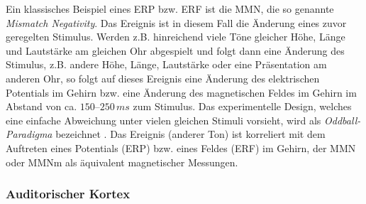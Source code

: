 \documentclass[doc,a4paper,12pt]{apa6}
\begin{document}
Ein klassisches Beispiel eines ERP bzw. ERF ist die MMN, die so genannte \emph{Mismatch Negativity}. Das Ereignis ist in diesem Fall die Änderung eines zuvor geregelten Stimulus. Werden z.B. hinreichend viele Töne gleicher Höhe, Länge und Lautstärke am gleichen Ohr abgespielt und folgt dann eine Änderung des Stimulus, z.B. andere Höhe, Länge, Lautstärke oder eine Präsentation am anderen Ohr, so folgt auf dieses Ereignis eine Änderung des elektrischen Potentials im Gehirn bzw. eine Änderung des magnetischen Feldes im Gehirn im Abstand von ca. $150$--$250\,ms$ zum Stimulus. Das experimentelle Design, welches eine einfache Abweichung unter vielen gleichen Stimuli  vorsieht, wird als \emph{Oddball-Paradigma} bezeichnet \parencite{squires1975two,naatanen1989event,paavilainen1991right}. Das Ereignis (\glqq anderer Ton\grqq) ist korreliert mit dem Auftreten eines Potentials (ERP) bzw. eines Feldes (ERF) im Gehirn, der MMN \parencite{naatanen1978early} oder MMNm als äquivalent magnetischer Messungen.

\subsubsection{Auditorischer Kortex}
\label{sec:audicort}
\end{document}
